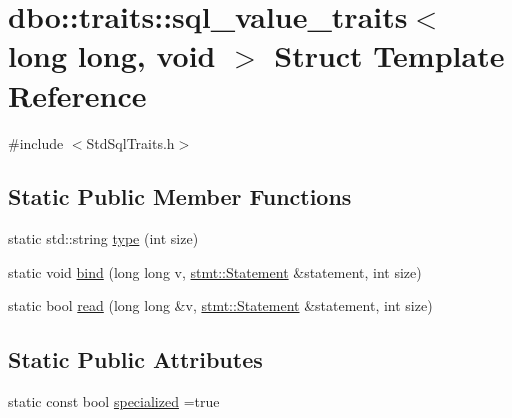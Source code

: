 \hypertarget{structdbo_1_1traits_1_1sql__value__traits_3_01long_01long_00_01void_01_4}{\section{dbo\+:\+:traits\+:\+:sql\+\_\+value\+\_\+traits$<$ long long, void $>$ Struct Template Reference}
\label{structdbo_1_1traits_1_1sql__value__traits_3_01long_01long_00_01void_01_4}
}


{\ttfamily \#include $<$Std\+Sql\+Traits.\+h$>$}

\subsection*{Static Public Member Functions}
\begin{DoxyCompactItemize}
\item 
static std\+::string \hyperlink{structdbo_1_1traits_1_1sql__value__traits_3_01long_01long_00_01void_01_4_a882c441114bc8d5367678498486bb406}{type} (int size)
\item 
static void \hyperlink{structdbo_1_1traits_1_1sql__value__traits_3_01long_01long_00_01void_01_4_a17e9403175dc6e4dd31d6ef6925e6053}{bind} (long long v, \hyperlink{classdbo_1_1stmt_1_1_statement}{stmt\+::\+Statement} \&statement, int size)
\item 
static bool \hyperlink{structdbo_1_1traits_1_1sql__value__traits_3_01long_01long_00_01void_01_4_a83ba40b8ab09959896bd7d4746e0f8ae}{read} (long long \&v, \hyperlink{classdbo_1_1stmt_1_1_statement}{stmt\+::\+Statement} \&statement, int size)
\end{DoxyCompactItemize}
\subsection*{Static Public Attributes}
\begin{DoxyCompactItemize}
\item 
static const bool \hyperlink{structdbo_1_1traits_1_1sql__value__traits_3_01long_01long_00_01void_01_4_ad9092faa08a6e0fab84acb9fe2c4ba7a}{specialized} =true
\end{DoxyCompactItemize}


